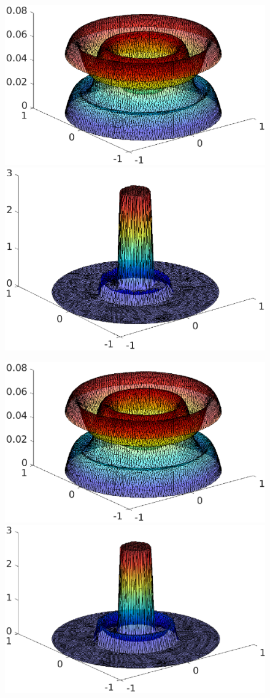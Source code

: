 \begin{frame}
\begin{overprint}
\begin{figure}
\end{figure}
\vspace*{-0.3 cm}
\begin{figure}
\includegraphics[width=0.48 \textwidth]{fig_article_chap_2/test_case_128/fig_u1u2_hmax0,09_Dt0,001_tt12.eps} 
\quad
\includegraphics[width=0.48 \textwidth]{fig_article_chap_2/test_case_128/fig_lambda_hmax0,09_Dt0,001_tt12.eps} 
\end{figure}
\begin{figure}
\includegraphics[width=0.48 \textwidth]{fig_article_chap_2/test_case_128/fig_u1u2_hmax0,09_Dt0,001_tt14.eps} 
\quad
\includegraphics[width=0.48 \textwidth]{fig_article_chap_2/test_case_128/fig_lambda_hmax0,09_Dt0,001_tt14.eps} 
\end{figure}
\end{overprint}
\end{frame}


